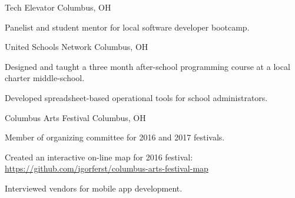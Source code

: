 

\begin{cventries}

  \cventry
    {} %
    {Tech Elevator} %
    {Columbus, OH} %
    {} %
    {
      \begin{cvitems} %
        \item {Panelist and student mentor for local software developer bootcamp.}
      \end{cvitems}
    }

  \cventry
    {} %
    {United Schools Network} %
    {Columbus, OH} %
    {} %
    {
      \begin{cvitems} %
        \item {Designed and taught a three month after-school programming course at a local charter middle-school.}
        \item {Developed spreadsheet-based operational tools for school administrators.}
      \end{cvitems}
    }

  \cventry
    {} %
    {Columbus Arts Festival} %
    {Columbus, OH} %
    {} %
    {
      \begin{cvitems} %
        \item {Member of organizing committee for 2016 and 2017 festivals.}
        \item {Created an interactive on-line map for 2016 festival: \url{https://github.com/igorferst/columbus-arts-festival-map}}
        \item {Interviewed vendors for mobile app development.}
      \end{cvitems}
    }

\end{cventries}
